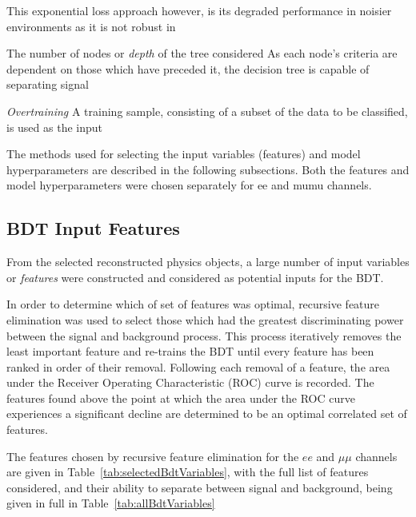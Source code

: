 This exponential loss approach however, is its degraded performance in noisier environments as it is not robust in 	

The number of nodes or \emph{depth} of the tree considered
As each node's criteria are dependent on those which have preceded it, the decision tree is capable of separating signal 

\emph{Overtraining}
A training sample, consisting of a subset of the data to be classified, is used as the input 




The methods used for selecting the input variables (features) and model hyperparameters are described in the following subsections.
Both the features and model hyperparameters were chosen separately for ee and mumu channels.

\subsection{BDT Input Features}
From the selected reconstructed physics objects, a large number of input variables or \emph{features} were constructed and considered as potential inputs for the BDT.

In order to determine which of set of features was optimal, recursive feature elimination was used to select those which had the greatest discriminating power between the signal and background process.
This process iteratively removes the least important feature and re-trains the BDT until every feature has been ranked in order of their removal.
Following each removal of a feature, the area under the Receiver Operating Characteristic (ROC) curve is recorded.
The features found above the point at which the area under the ROC curve experiences a significant decline are determined to be an optimal correlated set of features.
 
The features chosen by recursive feature elimination for the $ee$ and $\mu\mu$ channels are given in Table~\ref{tab:selectedBdtVariables}, with the full list of features considered, and their ability to separate between signal and background, being given in full in Table~\ref{tab:allBdtVariables}

